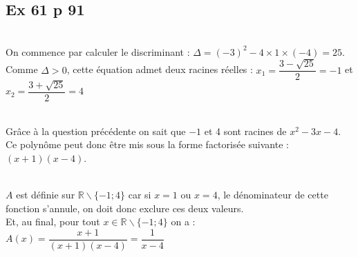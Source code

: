 \documentclass[12pt,a4paper]{book}
\begin{document}
\subsection*{Ex 61 p 91}
\begin{enumMet}
    \item {}\\
    On commence par calculer le discriminant : $\Delta=(-3)^{2}-4 \times 1 \times(-4)=25$.\\
    Comme $\Delta>0$, cette équation admet deux racines réelles : $x_{1}=\dfrac{3-\sqrt{25}}{2}=-1$ et $x_{2}=\dfrac{3+\sqrt{25}}{2}=4$
    \item {}\\ 
    Grâce à la question précédente on sait que $-1$ et 4 sont racines de $x^{2}-3 x-4 .$ Ce polynôme peut donc être mis sous la forme factorisée suivante : $(x+1)(x-4)$.
    \item {}\\ 
    $A$ est définie sur $\mathbb{R} \backslash\{-1 ; 4\}$ car si $x=1$ ou $x=4$, le dénominateur de cette fonction s'annule, on doit donc exclure ces deux valeurs.\\
    Et, au final, pour tout $x \in \mathbb{R} \backslash\{-1 ; 4\}$ on a :\\
    $A(x)=\dfrac{x+1}{(x+1)(x-4)}=\dfrac{1}{x-4}$
\end{enumMet}
\end{document}
